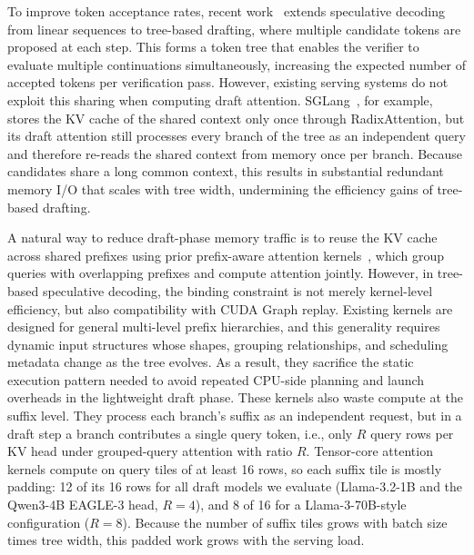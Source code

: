 \documentclass{article}
\begin{document}
To improve token acceptance rates, recent work~\cite{Miao_2024, li2025eaglespeculativesamplingrequires, chen2025sequoiascalablerobusthardwareaware} extends speculative decoding from linear sequences to tree-based drafting, where multiple candidate tokens are proposed at each step. This forms a token tree that enables the verifier to evaluate multiple continuations simultaneously, increasing the expected number of accepted tokens per verification pass. However, existing serving systems do not exploit this sharing when computing draft attention. SGLang~\cite{10.5555/3737916.3739916}, for example, stores the KV cache of the shared context only once through RadixAttention, but its draft attention still processes every branch of the tree as an independent query and therefore re-reads the shared context from memory once per branch. Because candidates share a long common context, this results in substantial redundant memory I/O that scales with tree width, undermining the efficiency gains of tree-based drafting.

A natural way to reduce draft-phase memory traffic is to reuse the KV cache across shared prefixes using prior prefix-aware attention kernels~\cite{hydragen, pan2025fasttree, yao2025deftdecodingflashtreeattention, cascade-inference}, which group queries with overlapping prefixes and compute attention jointly. However, in tree-based speculative decoding, the binding constraint is not merely kernel-level efficiency, but also compatibility with CUDA Graph replay. Existing kernels are designed for general multi-level prefix hierarchies, and this generality requires dynamic input structures whose shapes, grouping relationships, and scheduling metadata change as the tree evolves. As a result, they sacrifice the static execution pattern needed to avoid repeated CPU-side planning and launch overheads in the lightweight draft phase. 
These kernels also waste compute at the suffix level. They process each branch's suffix as an independent request, but in a draft step a branch contributes a single query token, i.e., only $R$ query rows per KV head under grouped-query attention with ratio $R$. Tensor-core attention kernels compute on query tiles of at least 16 rows, so each suffix tile is mostly padding: 12 of its 16 rows for all draft models we evaluate (Llama-3.2-1B and the Qwen3-4B EAGLE-3 head, $R{=}4$), and 8 of 16 for a Llama-3-70B-style configuration ($R{=}8$). Because the number of suffix tiles grows with batch size times tree width, this padded work grows with the serving load. 
\end{document}
